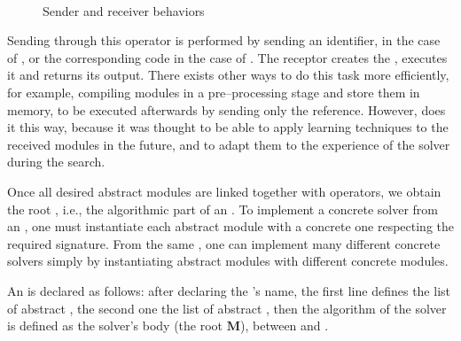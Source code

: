 
\begin{figure}[h]
\centering
{}\\
\caption[]{Sender and receiver behaviors}
\label{fig:send_recv}
\end{figure}

Sending \ms{} through this operator is performed by sending an identifier, in the case of \oms, or the corresponding \posl{} code in the case of \cms. The receptor \dopch{} creates the \m, executes it and returns its output. There exists other ways to do this task more efficiently, for example, compiling modules in a pre--processing stage and store them in memory, to be executed afterwards by sending only the reference. However, \posl{} does it this way, because it was thought to be able to apply learning techniques to the received modules in the future, and to adapt them to the experience of the solver during the search.

\separation

Once all desired abstract modules are linked together with operators, we obtain the root \cm{}, i.e., the algorithmic part of an \as. To implement a concrete solver from an \as, one must instantiate each abstract module with a concrete one respecting the required signature. From the same \as, one can implement many different concrete solvers simply by instantiating abstract modules with different concrete modules.

An \as{} is declared as follows: after declaring the \mbox{\tet{\bf \as}}'s name, the first line defines the list of abstract \oms, the second one the list of abstract \opchs, then the algorithm of the solver is defined as the solver's body (the root \cm{} $\mathbf{M}$), between \mbox{} and \mbox{}.

